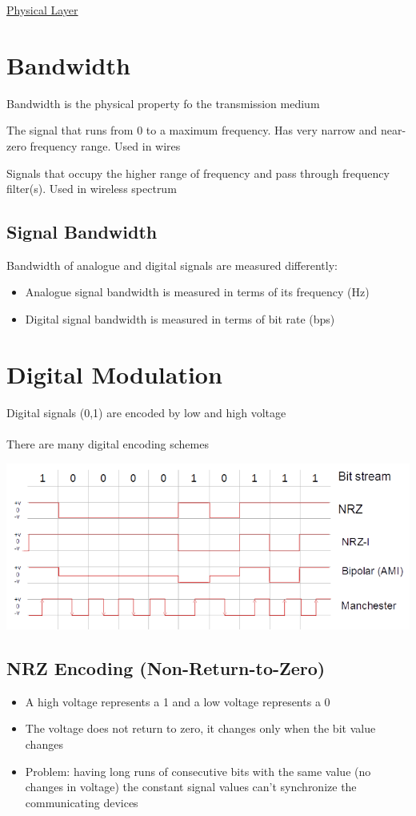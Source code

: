 \documentclass{article}[18pt]
\begin{document}
\begin{center}
\underline{\huge Physical Layer}
\end{center}
\section{Bandwidth}
Bandwidth is the physical property fo the transmission medium
\begin{defin}[Baseband]
	The signal that runs from 0 to a maximum frequency. Has very narrow and near-zero frequency range. Used in wires
\end{defin}
\begin{defin}[Passband]
	Signals that occupy the higher range of frequency and pass through frequency filter(s). Used in wireless spectrum
\end{defin}
\subsection{Signal Bandwidth}
Bandwidth of analogue and digital signals are measured differently:
\begin{itemize}
	\item Analogue signal bandwidth is measured in terms of its frequency (Hz)
	\item Digital signal bandwidth is measured in terms of bit rate (bps)
\end{itemize}
\section{Digital Modulation}
Digital signals (0,1) are encoded by low and high voltage\\
\\
There are many digital encoding schemes
\begin{center}
	\includegraphics[scale=0.7]{Modulation}
\end{center}
\subsection{NRZ Encoding (Non-Return-to-Zero)}
\begin{itemize}
	\item A high voltage represents a 1 and a low voltage represents a 0
	\item The voltage does not return to zero, it changes only when the bit value changes
\end{itemize}
\begin{itemize}
	\item Problem: having long runs of consecutive bits with the same value (no changes in voltage) the constant signal values can't synchronize the communicating devices
\end{itemize}
\end{document}
